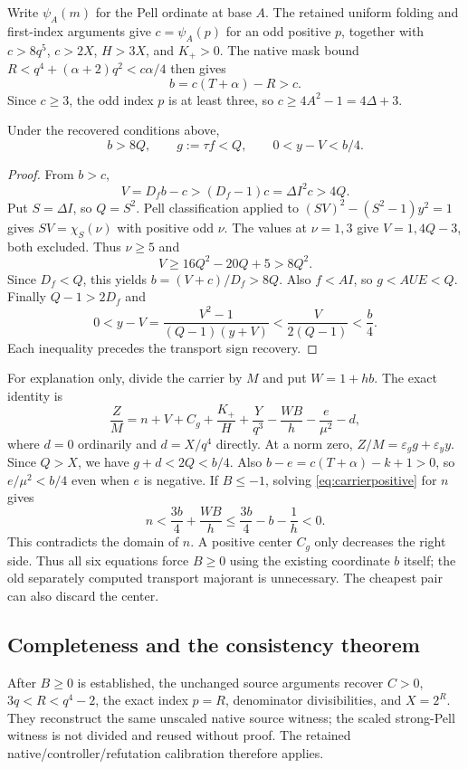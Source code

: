 Write $\psi_A(m)$ for the Pell ordinate at base $A$.
The retained uniform folding and first-index arguments give
$c=\psi_A(p)$ for an odd positive $p$, together with
$c>8q^5$, $c>2X$, $H>3X$, and $K_+>0$.
The native mask bound
$R<q^4+(\alpha+2)q^2<c\alpha/4$ then gives
\[
 b=c(T+\alpha)-R>c.
\]
Since $c\ge3$, the odd index $p$ is at least three, so
$c\ge4A^2-1=4\Delta+3$.

\begin{lemma}
Under the recovered conditions above,
\[
 b>8Q,\qquad g:=\tau f<Q,\qquad 0<y-V<b/4.
\]
\end{lemma}
\begin{proof}
From $b>c$,
\[
 V=D_fb-c>(D_f-1)c=\Delta I^2c>4Q.
\]
Put $S=\Delta I$, so $Q=S^2$. Pell classification applied to
$(SV)^2-(S^2-1)y^2=1$ gives $SV=\chi_S(\nu)$ with positive odd
$\nu$. The values at $\nu=1,3$ give $V=1,4Q-3$, both excluded.
Thus $\nu\ge5$ and
\[
 V\ge16Q^2-20Q+5>8Q^2.
\]
Since $D_f<Q$, this yields $b=(V+c)/D_f>8Q$.
Also $f<AI$, so $g<AUE<Q$.
Finally $Q-1>2D_f$ and
\[
 0<y-V=\frac{V^2-1}{(Q-1)(y+V)}
       <\frac{V}{2(Q-1)}<\frac b4.
\]
Each inequality precedes the transport sign recovery.
\end{proof}

For explanation only, divide the carrier by $M$ and put $W=1+hb$.
The exact identity is
\[
 \frac ZM=n+V+C_g+\frac{K_+}{H}+\frac{Y}{q^3}
          -\frac{WB}{h}-\frac e{\mu^2}-d,
 \tag{18}\label{eq:carrierpositive}
\]
where $d=0$ ordinarily and $d=X/q^4$ directly. At a norm zero,
$Z/M=\varepsilon_g g+\varepsilon_y y$.
Since $Q>X$, we have $g+d<2Q<b/4$. Also
$b-e=c(T+\alpha)-k+1>0$, so $e/\mu^2<b/4$ even when $e$ is negative.
If $B\le-1$, solving \eqref{eq:carrierpositive} for $n$ gives
\[
 n<\frac{3b}{4}+\frac{WB}{h}
   \le\frac{3b}{4}-b-\frac1h<0.
\]
This contradicts the domain of $n$. A positive center $C_g$ only decreases
the right side. Thus all six equations force $B\ge0$ using the existing
coordinate $b$ itself; the old separately computed transport majorant is
unnecessary. The cheapest pair can also discard the center.

\subsection{Completeness and the consistency theorem}
After $B\ge0$ is established, the unchanged source arguments recover
$C>0$, $3q<R<q^4-2$, the exact index $p=R$, denominator divisibilities,
and $X=2^R$. They reconstruct the same unscaled native source witness;
the scaled strong-Pell witness is not divided and reused without proof.
The retained native/controller/refutation calibration therefore applies.

